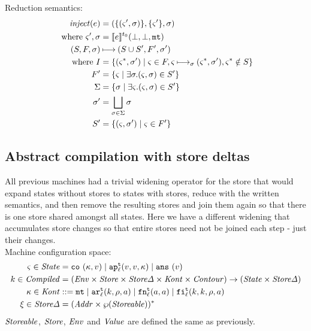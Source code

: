 \documentclass{llncs}
\newcommand{\finto}{\mathbin{\overset{\text{fin}}{\rightharpoonup}}}
\newcommand{\alt}{\mid}
\begin{document}
{Reduction semantics:
\begin{align*}
\mathit{inject}(e) &= (\{(\varsigma', \sigma)\},\{\varsigma'\},\sigma) \\
 \text{ where } \varsigma', \sigma &= \llbracket e\rrbracket^{{t_0}}(\bot,\bot,{\tt mt}) \\
(S,F,\sigma) &\mathbin{\longmapsto} (S \cup S', F', \sigma') \\
 \text{ where }
  I &= \{ (\varsigma^*, \sigma') \mid \varsigma \in F, \varsigma \mathbin{\longmapsto}_\sigma (\varsigma^*, \sigma'), \varsigma^*\notin S\} \\
  F' &= \{\varsigma \mid \exists \sigma. (\varsigma, \sigma) \in S'\} \\
  \Sigma &= \{\sigma \mid \exists \varsigma. (\varsigma, \sigma) \in S'\} \\
  \sigma' &= \bigsqcup\limits_{\sigma\in\Sigma}{\sigma} \\
  S' &= \{(\varsigma, \sigma') \mid \varsigma \in F'\}
\end{align*}

}
\subsection{Abstract compilation with store deltas}

All previous machines had a trivial widening operator for the store
that would expand states without stores to states with stores, reduce
with the written semantics, and then remove the resulting stores and
join them again so that there is one store shared amongst all
states. Here we have a different widening that accumulates store
changes so that entire stores need not be joined each step - just
their changes.
\\
Machine configuration space:
\begin{align*}
\mstate \in \State &= \co{\mkont, \mval} \alt
                     \ap[_\mlab^\mcntr]{\mval,\mval,\mkont} \alt
\spchoice{ }{\call[^\mcntr]{\mcomp,\menv,\mkont} \alt}
                     \ans{\mval} \\
\mcomp \in \Compiled &=
  (\Env \times \Store \times \StoreDelta \times \Kont \times \Counter) \to
   (\State \times \StoreDelta) \\
\mkont \in \Kont &::= \kmt \alt
                      \kar[_\mlab^\mcntr]{\mcomp, \menv, \maddr} \alt
                      \kfn[_\mlab^\mcntr]{\maddr, \maddr} \alt
                      \kif[_\mlab^\mcntr]{\mcomp, \mcomp, \menv, \maddr} \\
\msdiff \in \StoreDelta &= (\Addr \times \wp(\Storeable))^* %
\end{align*}
$\mathit{Storeable}$, $\mathit{Store}$, $\mathit{Env}$ and $\mathit{Value}$ are defined the same as previously.
\end{document}
